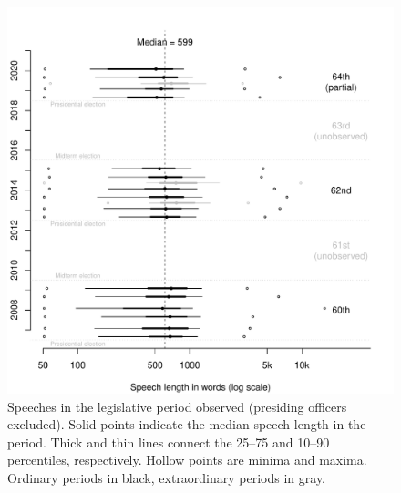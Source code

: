 \documentclass[letter,12pt]{article}
\begin{document}
\begin{figure}
  \centering
    \includegraphics[width=.8\columnwidth]{../plots/quantiles-periodo.pdf}
    \caption{Speeches in the legislative period observed (presiding officers excluded). Solid points indicate the median speech length in the period. Thick and thin lines connect the 25--75 and 10--90 percentiles, respectively. Hollow points are minima and maxima. Ordinary periods in black, extraordinary periods in gray.}\label{F:quantiles}
\end{figure}

\end{document}
